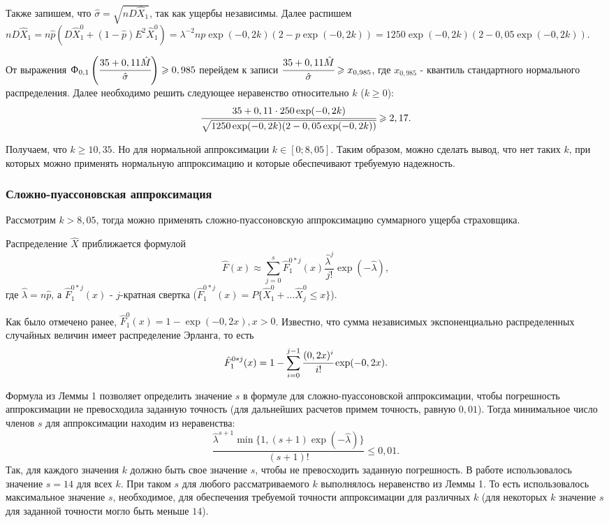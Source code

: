 \documentclass[a4paper,12pt]{article}
\begin{document}
Также запишем, что $\hat{\sigma} = \sqrt{n D\hat{X}_1}$, так как ущербы независимы.  Далее распишем $n D\hat{X}_1 = n\hat{p} (D\hat{X}_1^0 + (1-\hat{p})E^2\hat{X}_1^0) = \lambda^{-2}np\exp(-0,2k)(2 - p\exp(-0,2k)) = 1250 \exp(-0,2k)(2 - 0,05\exp(-0,2k))$. 

От выражения $\Upphi_{0, 1}\left(\cfrac{35 +0,11\hat{M}}{\hat{\sigma}}\right) \ge 0,985$ перейдем к записи $\cfrac{35 +0,11\hat{M}}{\hat{\sigma}} \ge x_{0,985}$, где $x_{0,985}$ - квантиль стандартного нормального распределения. Далее необходимо решить следующее неравенство относительно $k$ ($k \ge 0$):
\[\cfrac{35 + 0,11 \cdot 250 \exp(-0,2 k)}{\sqrt{1250 \exp(-0,2k)(2 - 0,05\exp(-0,2k))}} \ge 2,17.\]

Получаем, что $k \ge 10,35$. Но для нормальной аппроксимации $k \in [0; 8,05]$. Таким образом, можно сделать вывод, что нет таких $k$, при которых можно применять нормальную аппроксимацию и которые обеспечивают требуемую надежность.

\subsubsection{Сложно-пуассоновская аппроксимация}
Рассмотрим $k > 8,05$, тогда можно применять сложно-пуассоновскую аппроксимацию суммарного ущерба страховщика. 

Распределение $\hat{X}$ приближается формулой 
\[\hat{F}(x) \approx \sum_{j = 0}^{s} \hat{F}_1^{0 * j}(x) \frac{\hat{\lambda}^j}{j!}\exp (-\hat{\lambda}),\]
где $\hat{\lambda} = n\hat{p}$, а $\hat{F}_1^{0 * j}(x)$ - $j$-кратная свертка ($\hat{F}_1^{0 * j}(x) = P\{\hat{X}_1^0 + \dots \hat{X}_j^0 \le x\}$).

Как было отмечено ранее, $\hat{F}_1^0(x) = 1 - \exp(-0,2 x), x>0$. Известно, что сумма независимых экспоненциально распределенных случайных величин имеет распределение Эрланга, то есть
\[\hat{F}_1^{0 * j}(x) = 1 - \sum_{i = 0}^{j - 1} \cfrac{(0,2 x)^i}{i!} \exp(-0,2x).\]

Формула из Леммы 1 позволяет определить значение $s$ в формуле для сложно-пуассоновской аппроксимации, чтобы погрешность аппроксимации не превосходила заданную точность (для дальнейших расчетов примем точность, равную $0,01$). Тогда минимальное число членов $s$ для аппроксимации находим из неравенства:
\[\frac{\hat{\lambda}^{s + 1} \min\{1, (s + 1)\exp(-\hat{\lambda})\}}{(s + 1)!} \le 0,01.\]
Так, для каждого значения $k$ должно быть свое значение $s$, чтобы не превосходить заданную погрешность. В работе использовалось значение $s = 14$ для всех $k$. При таком $s$ для любого рассматриваемого $k$ выполнялось неравенство из Леммы 1. То есть использовалось максимальное значение $s$, необходимое, для обеспечения требуемой точности аппроксимации для различных $k$ (для некоторых $k$ значение $s$ для заданной точности могло быть меньше $14$).
\end{document}
